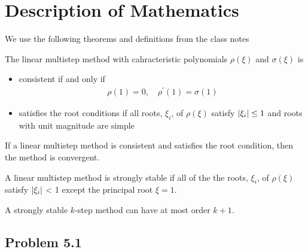\documentclass[12pt]{article}
\DeclarePairedDelimiter \abs{\lvert}{\rvert}%
\newenvironment{theorem}[2][]{\begin{trivlist}
\item[{\bfseries #1}\hskip \labelsep {\bfseries #2.}]}{\end{trivlist}}
\newenvironment{definition}[2][]{\begin{trivlist}
\item[{\bfseries #1}\hskip \labelsep {\bfseries #2.}]}{\end{trivlist}}
\theoremstyle{remark}
\begin{document}
\newpage 

\section{Description of Mathematics}

We use the following theorems and definitions from the class notes

\begin{definition}{Definition 22.2}
	The linear multistep method with cahracteristic polynomials $\rho(\xi)$ and $\sigma(\xi)$ is
	\begin{itemize}
		\item consistent if and only if 
		\begin{align*}
		\rho(1) = 0, \quad \rho^\prime(1) = \sigma(1)
		\end{align*}
		\item satisfies the root conditions if all roots, $\xi_i$, of $\rho(\xi)$ satisfy $\abs{\xi_i} \leq 1$ and roots with unit magnitude are simple 
	\end{itemize}
\end{definition}

\begin{theorem}{Theorem 22.2}
	If a linear multistep method is consistent and satisfies the root condition, then the method is convergent. 
\end{theorem}

\begin{definition}{Definition 22.3}
	A linear multistep method is strongly stable if all of the the roots, $\xi_i$, of $\rho(\xi)$ satisfy $\abs{\xi_i}$ < 1 except the principal root $\xi = 1$.
\end{definition}

\begin{theorem}{Theorem 22.3}
	A strongly stable $k$-step method can have at most order $k+1$.
\end{theorem}

\subsection{Problem 5.1}
\end{document}
